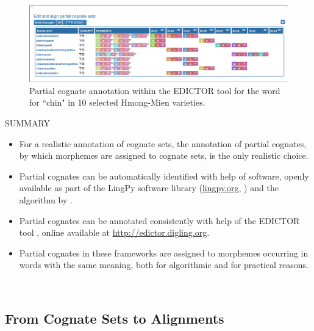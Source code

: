 \documentclass[xetex,svgnames]{scrartcl}
\begin{document}
\begin{figure}
  \centering
  \includegraphics[width=\textwidth]{partial-cognates.png}
  \caption{Partial cognate annotation within the EDICTOR tool for the word for ``chin" in 10
  selected Hmong-Mien varieties.}
  \label{fig:edipart}
\end{figure}

\begin{center}
  \hline
  SUMMARY \\\hline
  \begin{itemize}
    \item For a realistic annotation of cognate sets, the annotation of partial cognates, by which
      morphemes are assigned to cognate sets, is the only realistic choice.
    \item Partial cognates can be automatically identified with help of software, openly available
      as part of the LingPy software library (\url{lingpy.org}, \citealt{List2018i}) and the
      algorithm by \citet{List2016g}.
    \item Partial cognates can be annotated consistently with help of the EDICTOR tool
      \citep{List2017d}, online available at \url{http://edictor.digling.org}.
    \item Partial cognates in these frameworks are assigned to morphemes occurring in words with the
      same meaning, both for algorithmic and for practical reasons.
  \end{itemize}\\\hline
  \endtabular
\end{center}


\subsection{From Cognate Sets to Alignments}
\end{document}
